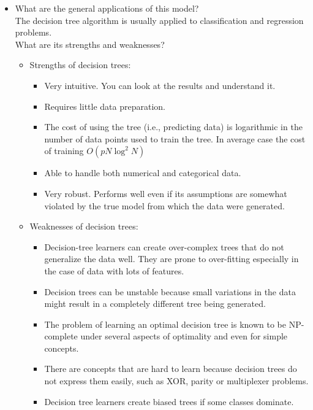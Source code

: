 \documentclass[12pt]{article}
\begin{document}
\begin{itemize}
\item What are the general applications of this model?\\
The decision tree algorithm is usually applied to classification and regression problems.\\
What are its strengths and weaknesses?\\  
       \begin{itemize}
       \item Strengths of decision trees:
              \begin{itemize}[noitemsep,nolistsep]
                     \item Very intuitive. You can look at the results and understand it. 
                     \item Requires little data preparation. 
                     \item The cost of using the tree (i.e., predicting data) is logarithmic in the number of data points used to train the tree. In average case the cost of training $ O(pN\log^2 N)$
                     \item Able to handle both numerical and categorical data.
                     \item Very robust. Performs well even if its assumptions are somewhat violated by the true model from which the data were generated.
              \end{itemize}
       \item Weaknesses of decision trees:
              \begin{itemize}[noitemsep,nolistsep]
                     \item Decision-tree learners can create over-complex trees that do not generalize the data well. They are prone to over-fitting especially in the case of data with lots of features.
                     \item Decision trees can be unstable because small variations in the data might result in a completely different tree being generated. 
                     \item The problem of learning an optimal decision tree is known to be NP-complete under several aspects of optimality and even for simple concepts. 
                     \item There are concepts that are hard to learn because decision trees do not express them easily, such as XOR, parity or multiplexer problems.
                     \item Decision tree learners create biased trees if some classes dominate. 
              \end{itemize}
       \end{itemize}



\end{itemize}
\end{document}
